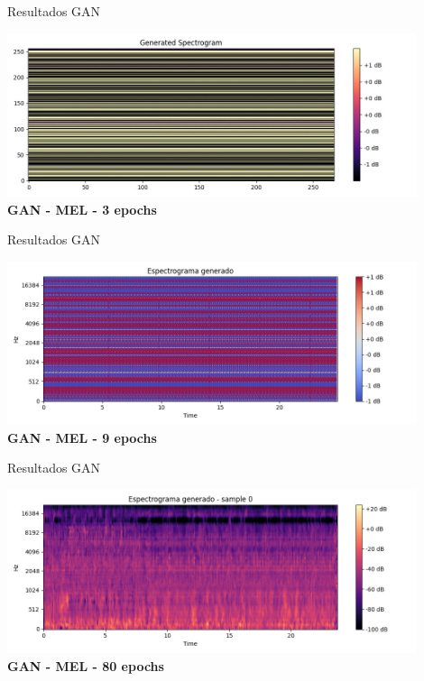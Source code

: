 \documentclass{beamer}
\begin{document}
\begin{frame}{Resultados GAN}
  \begin{center}
  \includegraphics[width=0.9\textwidth]{images/gan_generated_0.jpeg} \\
  \textbf{GAN - MEL - 3 epochs} \\
\end{center}
\end{frame}

\begin{frame}{Resultados GAN}
  \begin{center}
  \includegraphics[width=0.9\textwidth]{images/gan_generated_1.jpeg} \\
  \textbf{GAN - MEL - 9 epochs} \\
\end{center}
\end{frame}
\begin{frame}{Resultados GAN}
  \begin{center}
  \includegraphics[width=0.9\textwidth]{images/gan_generated_2.jpeg} \\
  \textbf{GAN - MEL - 80 epochs} \\
\end{center}
\end{frame}
\end{document}
